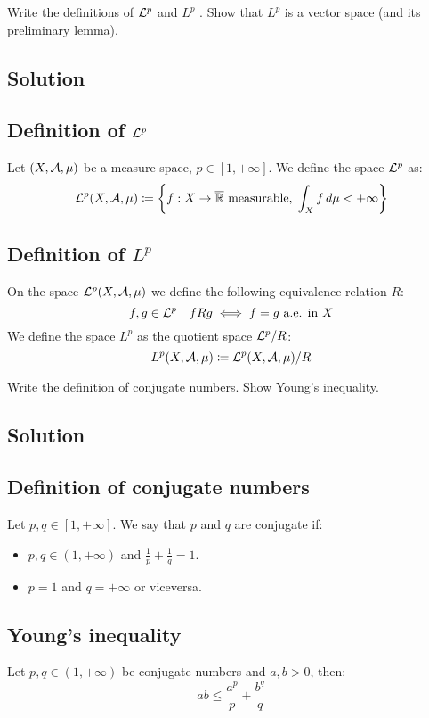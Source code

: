 
\question
Write the definitions of $\mathcal{L}^p$ and $L^p$ . Show that $L^p$ is a vector space (and its preliminary lemma).

\subsection*{Solution}

\subsection{Definition of \texorpdfstring{$\mathcal{L}^p$}{Lp}}
Let $(X,\mathcal{A}, \mu)$ be a measure space, $p\in[1,+\infty]$. We define the space $\mathcal{L}^p$ as:
\[ \mathcal{L}^p(X,\mathcal{A}, \mu) \coloneqq \left\{ f:X\to\overline{\mathbb{R}} \text{ measurable}, \; \int_X f \, d\mu < +\infty \right\} \]

\subsection{Definition of \texorpdfstring{$L^p$}{Lp}}
On the space $\mathcal{L}^p(X,\mathcal{A}, \mu)$ we define the following equivalence relation $R$:
\[ f,g\in\mathcal{L}^p \quad f R g \iff f=g \text{ a.e. in } X \]
We define the space $L^p$ as the quotient space $\mathcal{L}^p/R$:
\[ L^p(X,\mathcal{A}, \mu) \coloneqq \mathcal{L}^p(X,\mathcal{A}, \mu)/R \]


\question
Write the definition of conjugate numbers. Show Young's inequality.

\subsection*{Solution}

\subsection{Definition of conjugate numbers}
Let $p,q\in[1,+\infty]$. We say that $p$ and $q$ are conjugate if:
\begin{itemize}
    \item $p,q \in (1,+\infty)$ and $\frac{1}{p}+\frac{1}{q}=1$.
    \item $p=1$ and $q=+\infty$ or viceversa.
\end{itemize}

\subsection{Young's inequality}
Let $p,q \in (1,+\infty)$ be conjugate numbers and $a,b > 0$, then:
\[ ab \leq \frac{a^p}{p} + \frac{b^q}{q} \]

